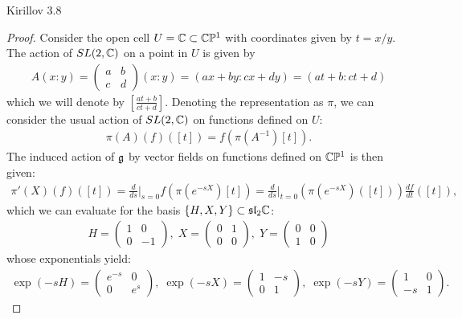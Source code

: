 \documentclass{../../mathnotes}
\begin{document}
\begin{prop}
    Kirillov 3.8
\end{prop}
\begin{proof}
    Consider the open cell $U=\mathbb{C}\subset\mathbb{C}\mathbb{P}^1$ with coordinates given by $t=x/y$. The action of $SL(2,\mathbb{C})$ on a point in $U$ is given by
    \begin{align*}
        A(x:y)=\begin{pmatrix}
            a & b\\c & d
        \end{pmatrix}
        (x:y)=(ax+by:cx+dy)=(at+b:ct+d)
    \end{align*}
    which we will denote by $[\frac{at+b}{ct+d}]$. Denoting the representation as $\pi$, we can consider the usual action of $SL(2,\mathbb{C})$ on functions
    defined on $U$:
    \begin{align*}
        \pi(A)(f)([t])=f(\pi(A^{-1})[t]).
    \end{align*}
    The induced action of $\mathfrak g$ by vector fields on functions defined on $\mathbb{C}\mathbb{P}^1$ is then given:
    \begin{align*}
        \pi'(X)(f)([t])=\frac{d}{ds}\bigg|_{s=0}f(\pi(e^{-sX})[t])=\frac{d}{ds}\bigg|_{t=0}\left( \pi(e^{-sX})([t]) \right)\frac{df}{dt}([t]),
    \end{align*}
    which we can evaluate for the basis $\left\{ H,X,Y \right\}\subset \mathfrak{sl}_2\mathbb{C}$:
    \begin{align*}
        H=\begin{pmatrix}1&0\\0&-1\end{pmatrix},\;
            X=\begin{pmatrix}0&1\\0&0\end{pmatrix},\;
                Y=\begin{pmatrix}0&0\\1&0\end{pmatrix}
    \end{align*}
    whose exponentials yield:
    \begin{align*}
        \exp(-sH)=\begin{pmatrix}e^{-s}&0\\0&e^{s}\end{pmatrix},\;
            \exp(-sX)=\begin{pmatrix}1&-s\\0&1\end{pmatrix},\;
                \exp(-sY)=\begin{pmatrix}1&0\\-s&1\end{pmatrix}.

\end{align*}
\end{proof}
\end{document}
